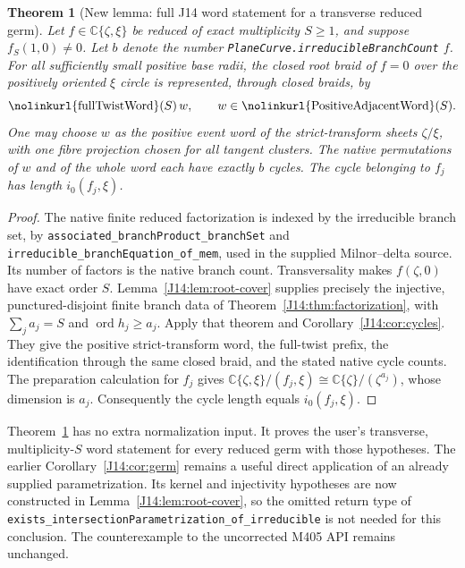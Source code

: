 \documentclass[11pt,oneside]{report}
\newtheorem{theorem}{Theorem}[section]
\theoremstyle{definition}
\numberwithin{equation}{section}
\newcommand{\C}{\mathbb C}
\newcommand{\decl}[1]{\textnormal{\nolinkurl{#1}}}
\newcommand{\ord}{\operatorname{ord}}
\begin{document}
\begin{theorem}[New lemma: full J14 word statement for a transverse reduced germ]
\label{J14:thm:transverse-germ}
Let $f\in\C\{\zeta,\xi\}$ be reduced of exact multiplicity
$S\geq1$, and suppose $f_S(1,0)\ne0$. Let $b$ denote the number
\decl{PlaneCurve.irreducibleBranchCount} $f$.
For all sufficiently small positive base radii, the closed root braid
of $f=0$ over the positively oriented $\xi$ circle is represented,
through closed braids, by
\[
 \decl{fullTwistWord}(S)\,w,
 \qquad w\in\decl{PositiveAdjacentWord}(S).
\]
One may choose $w$ as the positive event word of the strict-transform
sheets $\zeta/\xi$, with one fibre projection chosen for all tangent
clusters. The native permutations of $w$ and of the whole word each
have exactly $b$ cycles. The cycle belonging to $f_j$ has length
$i_0(f_j,\xi)$.
\end{theorem}
\begin{proof}
The native finite reduced factorization is indexed by the irreducible
branch set, by \decl{associated_branchProduct_branchSet} and
\decl{irreducible_branchEquation_of_mem}, used in the supplied
Milnor--delta source. Its number of factors is the native branch
count. Transversality makes $f(\zeta,0)$ have exact order $S$.
Lemma~\ref{J14:lem:root-cover} supplies precisely the injective,
punctured-disjoint finite branch data of
Theorem~\ref{J14:thm:factorization}, with
$\sum_j a_j=S$ and $\ord h_j\geq a_j$.
Apply that theorem and Corollary~\ref{J14:cor:cycles}.
They give the positive strict-transform word, the full-twist prefix,
the identification through the same closed braid, and the stated
native cycle counts. The preparation calculation for $f_j$ gives
$\C\{\zeta,\xi\}/(f_j,\xi)\cong
\C\{\zeta\}/(\zeta^{a_j})$, whose dimension is $a_j$.
Consequently the cycle length equals $i_0(f_j,\xi)$.
\end{proof}

Theorem~\ref{J14:thm:transverse-germ} has no extra normalization input.
It proves the user's transverse, multiplicity-$S$ word statement for
every reduced germ with those hypotheses. The earlier
Corollary~\ref{J14:cor:germ} remains a useful direct application of an
already supplied parametrization. Its kernel and injectivity hypotheses
are now constructed in Lemma~\ref{J14:lem:root-cover}, so the omitted return
type of \decl{exists_intersectionParametrization_of_irreducible} is not
needed for this conclusion. The counterexample to the uncorrected M405
API remains unchanged.
\end{document}
